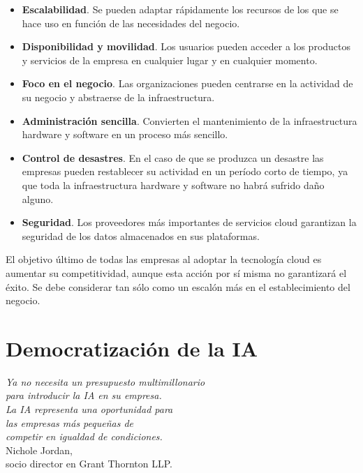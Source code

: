 \begin{itemize}
    \item \textbf{Escalabilidad}. Se pueden adaptar rápidamente los recursos de los que se hace uso en función de las necesidades del negocio.
    \item \textbf{Disponibilidad y movilidad}. Los usuarios pueden acceder a los productos y servicios de la empresa en cualquier lugar y en cualquier momento. 
    \item \textbf{Foco en el negocio}. Las organizaciones pueden centrarse en la actividad de su negocio y abstraerse de la infraestructura.
    \item \textbf{Administración sencilla}. Convierten el mantenimiento de la infraestructura hardware y software en un proceso más sencillo.
    \item \textbf{Control de desastres}. En el caso de que se produzca un desastre las empresas pueden restablecer su actividad en un período corto de tiempo, ya que toda la infraestructura hardware y software no habrá sufrido daño alguno.
    \item \textbf{Seguridad}. Los proveedores más importantes de servicios cloud garantizan la seguridad de los datos almacenados en sus plataformas.
\end{itemize}

El objetivo último de todas las empresas al adoptar la tecnología cloud es aumentar su competitividad, aunque esta acción por sí misma no garantizará el éxito. Se debe considerar tan sólo como un escalón más en el establecimiento del negocio.

\newpage

\section{Democratización de la IA}

\begin{flushright}
\begin{minipage}[b][4cm][t]{11cm}
\begin{flushright}
{\small \emph{Ya no necesita un presupuesto multimillonario }} \vspace{-1pt} \\
{\small \emph{para introducir la IA en su empresa. }} \vspace{-1pt} \\
{\small \emph{La IA representa una oportunidad para }} \vspace{-1pt} \\
{\small \emph{las empresas más pequeñas de }} \vspace{-1pt} \\
{\small \emph{competir en igualdad de condiciones.}} \vspace{1mm}\\
{\footnotesize Nichole Jordan,} \vspace{-1.5pt} \\
{\footnotesize socio director en Grant Thornton LLP.\phantom{l}}
\end{flushright}
\end{minipage}
\end{flushright}

